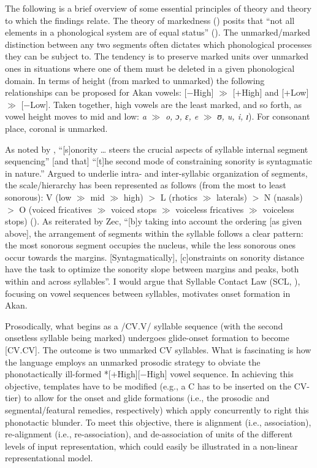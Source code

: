 \documentclass[output=paper,colorlinks,citecolor=brown]{langscibook}
\begin{document}
The following is a brief overview of some essential principles of  theory and  theory to which the findings relate. The theory of markedness (\citealt{deLacy2002, deLacy2006, Lombardi2002}) posits that “not all elements in a phonological system are of equal status” (\citealt{Rice2007}). The unmarked/marked distinction between any two segments often dictates which phonological processes they can be subject to. The tendency is to preserve marked units over unmarked ones in situations where one of them must be deleted in a given phonological domain. In terms of height (from marked to unmarked) the following relationships can be proposed for Akan vowels: [−High] $\gg$ [+High] and [+Low] $\gg$ [−Low]. Taken together, high vowels are the least marked, and so forth, as vowel height moves to mid and low: \textit{a} $\gg$ \textit{o, ɔ, ɛ, e} $\gg$ \textit{ʊ, u, i, ɪ}). For consonant place, coronal is unmarked. 

As noted by \citet[178--179]{Zec2007}, “[s]onority … steers the crucial aspects of syllable internal segment sequencing” [and that] “[t]he second mode of constraining sonority is syntagmatic in nature.” Argued to underlie intra- and inter-syllabic organization of segments, the  scale/hierarchy has been represented as follows (from the most to least sonorous): V (low $\gg$ mid $\gg$ high) $>$ L (rhotics $\gg$ laterals) $>$ N (nasals) $>$ O (voiced fricatives $\gg$ voiced stops $\gg$ voiceless fricatives $\gg$ voiceless stops) (\cite[178]{Zec2007}). As reiterated by Zec, “[b]y taking into account the ordering [as given above], the arrangement of segments within the syllable follows a clear pattern: the most sonorous segment occupies the nucleus, while the less sonorous ones occur towards the margins. [Syntagmatically], [c]onstraints on sonority distance have the task to optimize the sonority slope between margins and peaks, both within and across syllables''. I would argue that Syllable Contact Law (SCL, \cite{MurrayVennemann1983}), focusing on vowel sequences between syllables, motivates onset formation in Akan.

Prosodically, what begins as a /CV.V/ syllable sequence (with the second onsetless syllable being marked) undergoes glide-onset formation to become [CV.CV]. The outcome is two unmarked CV syllables. What is fascinating is how the language employs an unmarked prosodic strategy to obviate the phonotactically ill-formed *[+High][−High]  vowel sequence. In achieving this objective, templates have to be modified (e.g., a C has to be inserted on the CV-tier) to allow for the onset and glide formations (i.e., the prosodic and segmental/featural remedies, respectively) which apply concurrently to right this phonotactic blunder. To meet this objective, there is alignment (i.e., association), re-alignment (i.e., re-association), and de-association of units of the different levels of input representation, which could easily be illustrated in a non-linear representational model.\largerpage 
\end{document}
